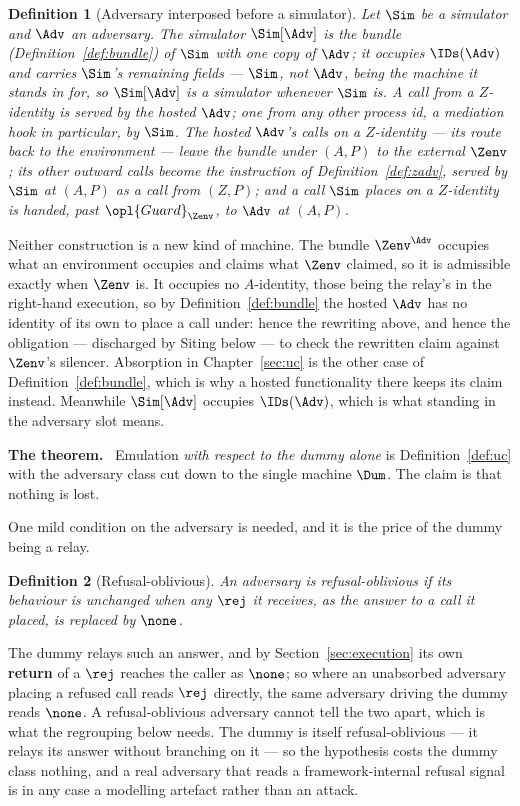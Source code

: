 \documentclass[10pt,oneside,openany]{book}
\newcommand{\heading}[1]{\medskip\par\noindent\textcolor{accent}{\textbf{#1.}}\ }
\theoremstyle{accentdef}
\newtheorem{definition}{Definition}[chapter]
\theoremstyle{accentplain}
\begin{document}
\begin{definition}[Adversary interposed before a simulator]\label{def:sadv}
Let $\Sim$ be a simulator and $\Adv$ an adversary. The simulator $\Sim[\Adv]$ is the bundle
(Definition~\ref{def:bundle}) of $\Sim$ with one copy of $\Adv$; it occupies $\IDs(\Adv)$ and
carries $\Sim$'s remaining fields --- $\Sim$, not $\Adv$, being the machine it stands in for, so
$\Sim[\Adv]$ is a simulator whenever $\Sim$ is. A call from a $Z$-identity is served by the hosted
$\Adv$; one from any other process id, a mediation hook in particular, by $\Sim$. The hosted
$\Adv$'s calls on a $Z$-identity --- its route back to the environment --- leave the bundle under
$(A,P)$ to the external $\Zenv$; its other outward calls become the instruction of
Definition~\ref{def:zadv}, served by $\Sim$ at $(A,P)$ as a call from $(Z,P)$; and a call $\Sim$
places on a $Z$-identity is handed, past $\opl{Guard}_{\Zenv}$, to $\Adv$ at $(A,P)$.
\end{definition}

Neither construction is a new kind of machine. The bundle $\Zenv^{\Adv}$ occupies what an environment
occupies and claims what $\Zenv$ claimed, so it is admissible exactly when $\Zenv$ is. It occupies
no $A$-identity, those being the relay's in the right-hand execution, so by
Definition~\ref{def:bundle} the hosted $\Adv$ has no identity of its own to place a call under: hence
the rewriting above, and hence the obligation --- discharged by Siting below --- to check the
rewritten claim against $\Zenv$'s silencer. Absorption in Chapter~\ref{sec:uc} is the other case
of Definition~\ref{def:bundle}, which is why a hosted functionality there keeps its claim instead. Meanwhile
$\Sim[\Adv]$ occupies $\IDs(\Adv)$, which is what standing in the adversary slot means.

\heading{The theorem} Emulation \emph{with respect to the dummy alone} is Definition~\ref{def:uc}
with the adversary class cut down to the single machine $\Dum$. The claim is that nothing is lost.

One mild condition on the adversary is needed, and it is the price of the dummy being a relay.

\begin{definition}[Refusal-oblivious]\label{def:refobl}
An adversary is \emph{refusal-oblivious} if its behaviour is unchanged when any $\rej$ it receives, as
the answer to a call it placed, is replaced by $\none$.
\end{definition}

The dummy relays such an
answer, and by Section~\ref{sec:execution} its own \textbf{return} of a $\rej$ reaches the caller
as $\none$; so where an unabsorbed adversary placing a refused call reads $\rej$ directly, the
same adversary driving the dummy reads $\none$. A refusal-oblivious adversary cannot tell the
two apart, which is what the regrouping below needs. The dummy is itself refusal-oblivious ---
it relays its answer without branching on it --- so the hypothesis costs the dummy class nothing,
and a real adversary that reads a framework-internal refusal signal is in any case a modelling
artefact rather than an attack.
\end{document}

